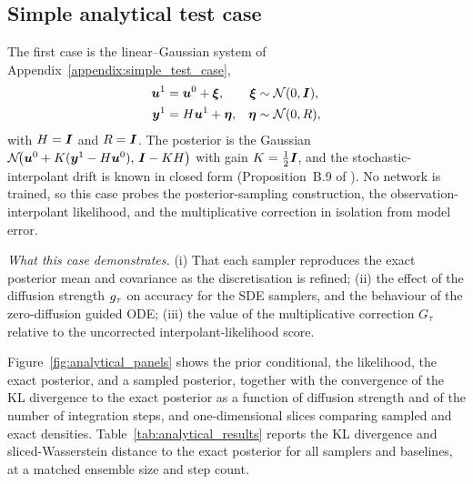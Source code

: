 \subsection{Simple analytical test case}
\label{subsec:results_analytical}
The first case is the linear--Gaussian system of Appendix~\ref{appendix:simple_test_case},
\begin{subequations}\label{eq:analytical_system}
\begin{align}
    \boldsymbol{u}^1 &= \boldsymbol{u}^{0} + \boldsymbol{\xi}, & \boldsymbol{\xi} &\sim \mathcal{N}(0,\bm{I}),\\
    \boldsymbol{y}^1 &= H\boldsymbol{u}^1 + \boldsymbol{\eta}, & \boldsymbol{\eta} &\sim \mathcal{N}(0,R),
\end{align}
\end{subequations}
with $H=\bm{I}$ and $R=\bm{I}$. The posterior is the Gaussian $\mathcal{N}\!\big(\boldsymbol{u}^0+K(\boldsymbol{y}^1-H\boldsymbol{u}^0),\,\bm{I}-KH\big)$ with gain $K=\tfrac12\bm{I}$, and the stochastic-interpolant drift is known in closed form (Proposition~B.9 of \cite{chen_probabilistic_2024}). No network is trained, so this case probes the posterior-sampling construction, the observation-interpolant likelihood, and the multiplicative correction in isolation from model error.

\emph{What this case demonstrates.} (i) That each sampler reproduces the exact posterior mean and covariance as the discretisation is refined; (ii) the effect of the diffusion strength $g_\tau$ on accuracy for the SDE samplers, and the behaviour of the zero-diffusion guided ODE; (iii) the value of the multiplicative correction $G_\tau$ relative to the uncorrected interpolant-likelihood score.

Figure~\ref{fig:analytical_panels} shows the prior conditional, the likelihood, the exact posterior, and a sampled posterior, together with the convergence of the KL divergence to the exact posterior as a function of diffusion strength and of the number of integration steps, and one-dimensional slices comparing sampled and exact densities. Table~\ref{tab:analytical_results} reports the KL divergence and sliced-Wasserstein distance to the exact posterior for all samplers and baselines, at a matched ensemble size and step count.

